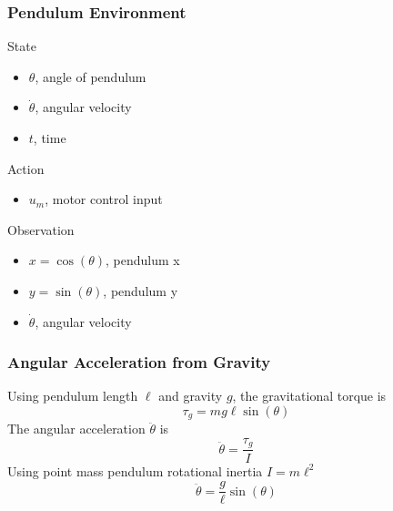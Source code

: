 \documentclass[aspectratio=169,11pt,xcolor=dvipsnames]{beamer}
\begin{document}
\begin{frame}
  \frametitle{Pendulum Environment}
  \begin{center}
    \begin{minipage}{.32\textwidth}
      State
      \begin{itemize}
        \item $\theta$, angle of pendulum
        \item $\dot{\theta}$, angular velocity
        \item $t$, time
      \end{itemize}
    \end{minipage}
    \begin{minipage}{.2\textwidth}
      Action
      \begin{itemize}
        \item $u_m$, motor control input
      \end{itemize}
    \end{minipage}
    \begin{minipage}{.32\textwidth}
      Observation
      \begin{itemize}
        \item $x=\cos(\theta)$, pendulum x
        \item $y=\sin(\theta)$, pendulum y
        \item $\dot{\theta}$, angular velocity
      \end{itemize}
    \end{minipage}
  \end{center}
\end{frame}

\begin{frame}
  \frametitle{Angular Acceleration from Gravity}
  \begin{center}
    \begin{minipage}{.75\textwidth}
      Using pendulum length $\ell$ and gravity $g$, the gravitational torque is
      \begin{equation*}
        \tau_g = m g \ell \sin(\theta)
      \end{equation*}
      The angular acceleration $\ddot{\theta}$ is
      \begin{equation*}
        \ddot{\theta} = \frac{\tau_g}{I}
      \end{equation*}
      Using point mass pendulum rotational inertia $I = m \ell^2$
      \begin{equation*}
        \ddot{\theta} = \frac{g}{\ell}\sin(\theta)
      \end{equation*}
    \end{minipage}
  \end{center}
\end{frame}
\end{document}
